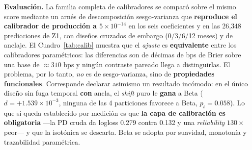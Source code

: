 \documentclass[12pt, a4paper]{article}
\begin{document}
\noindent\textbf{Evaluación.} La familia completa de calibradores se comparó sobre el mismo score
mediante un arnés de descomposición sesgo-varianza que \textbf{reproduce el calibrador de producción
a $5\times10^{-14}$} en los seis coeficientes y en las 26{,}348 predicciones de Z1, con diseños
cruzados de embargo (0/3/6/12 meses) y de anclaje. El Cuadro~\ref{tab:calib} muestra que el
\emph{ajuste} es \textbf{equivalente} entre los calibradores paramétricos: las diferencias son de
décimas de bps de Brier sobre una base de $\approx310$ bps y ningún contraste pareado llega a
distinguirlas. El problema, por lo tanto, \emph{no} es de sesgo-varianza, sino de
\textbf{propiedades funcionales}. Corresponde declarar asimismo un resultado incómodo: en el único
diseño sin fuga temporal \textbf{con} ancla, el \emph{shift} puro le \textbf{gana} a Beta
($d=+1.539\times10^{-3}$, ninguna de las 4 particiones favorece a Beta, $p_t=0.058$). Lo que sí
queda establecido por medición es que \textbf{la capa de calibración es obligatoria} ---la PD cruda
da logloss 0.279 contra 0.132 y una \emph{reliability} $130\times$ peor--- y que la isotónica se
descarta. Beta se adopta por suavidad, monotonía y trazabilidad paramétrica.
\end{document}
